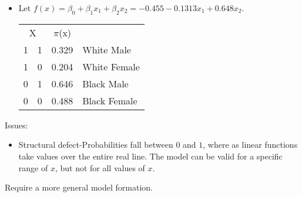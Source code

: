 \documentclass[12pt]{beamer}
\begin{document}
\begin{frame}
  \begin{itemize}
    \item<1-> Let
    $f(x)=\beta_{0}+\beta_{1}x_{1}+\beta_{2}x_{2}=-0.455-0.1313x_{1}+0.648x_{2}$.

    \begin{center}
      \begin{tabular}{cccl} \hline
      \multicolumn{2}{c}{X}& $\pi$(x)&\\
      1&1&0.329&White Male\\
      1&0&0.204&White Female\\
      0&1&0.646&Black Male\\
      0&0&0.488&Black Female\\
      \hline
      \end{tabular}
    \end{center}
  \end{itemize}
\end{frame}


\begin{frame}
  Issues:
  \begin{itemize}
    \item<1-> Structural defect-Probabilities fall between $0$ and
    $1$, where as linear functions take values over the entire
    real line. The model can be valid for a specific range of
    $x$, but not for all values of $x$.
  \end{itemize}
  Require a more general model formation.
\end{frame}
\end{document}
